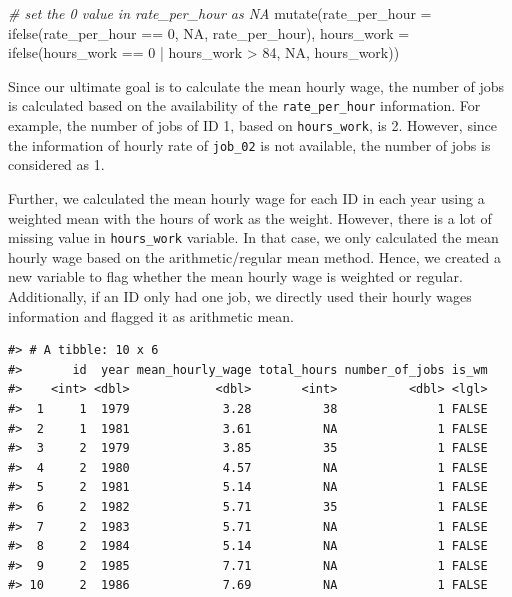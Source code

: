 \documentclass{article}
\newenvironment{Shaded}{\begin{snugshade}}{\end{snugshade}}
\newcommand{\AttributeTok}[1]{\textcolor[rgb]{0.77,0.63,0.00}{#1}}
\newcommand{\CommentTok}[1]{\textcolor[rgb]{0.56,0.35,0.01}{\textit{#1}}}
\newcommand{\ConstantTok}[1]{\textcolor[rgb]{0.00,0.00,0.00}{#1}}
\newcommand{\DecValTok}[1]{\textcolor[rgb]{0.00,0.00,0.81}{#1}}
\newcommand{\FunctionTok}[1]{\textcolor[rgb]{0.00,0.00,0.00}{#1}}
\newcommand{\NormalTok}[1]{#1}
\newcommand{\SpecialCharTok}[1]{\textcolor[rgb]{0.00,0.00,0.00}{#1}}
\begin{document}
\begin{Shaded}
\begin{Highlighting}[]
  \CommentTok{\# set the 0 value in rate\_per\_hour as NA}
  \FunctionTok{mutate}\NormalTok{(}\AttributeTok{rate\_per\_hour =} \FunctionTok{ifelse}\NormalTok{(rate\_per\_hour }\SpecialCharTok{==} \DecValTok{0}\NormalTok{, }\ConstantTok{NA}\NormalTok{,}
\NormalTok{                                rate\_per\_hour),}
         \AttributeTok{hours\_work =} \FunctionTok{ifelse}\NormalTok{(hours\_work }\SpecialCharTok{==} \DecValTok{0} \SpecialCharTok{|}\NormalTok{ hours\_work }\SpecialCharTok{\textgreater{}} \DecValTok{84}\NormalTok{, }\ConstantTok{NA}\NormalTok{, hours\_work))}
\end{Highlighting}
\end{Shaded}

Since our ultimate goal is to calculate the mean hourly wage, the number of jobs is calculated based on the availability of the \texttt{rate\_per\_hour} information. For example, the number of jobs of ID 1, based on \texttt{hours\_work}, is 2. However, since the information of hourly rate of \texttt{job\_02} is not available, the number of jobs is considered as 1.

Further, we calculated the mean hourly wage for each ID in each year using a weighted mean with the hours of work as the weight. However, there is a lot of missing value in \texttt{hours\_work} variable. In that case, we only calculated the mean hourly wage based on the arithmetic/regular mean method. Hence, we created a new variable to flag whether the mean hourly wage is weighted or regular. Additionally, if an ID only had one job, we directly used their hourly wages information and flagged it as arithmetic mean.

\begin{verbatim}
#> # A tibble: 10 x 6
#>       id  year mean_hourly_wage total_hours number_of_jobs is_wm
#>    <int> <dbl>            <dbl>       <int>          <dbl> <lgl>
#>  1     1  1979             3.28          38              1 FALSE
#>  2     1  1981             3.61          NA              1 FALSE
#>  3     2  1979             3.85          35              1 FALSE
#>  4     2  1980             4.57          NA              1 FALSE
#>  5     2  1981             5.14          NA              1 FALSE
#>  6     2  1982             5.71          35              1 FALSE
#>  7     2  1983             5.71          NA              1 FALSE
#>  8     2  1984             5.14          NA              1 FALSE
#>  9     2  1985             7.71          NA              1 FALSE
#> 10     2  1986             7.69          NA              1 FALSE
\end{verbatim}
\end{document}

